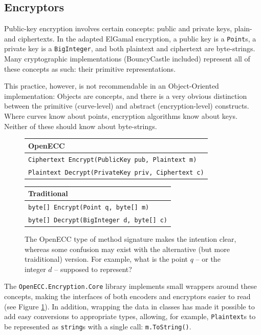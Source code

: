 \subsection{Encryptors}

Public-key encryption involves certain concepts: public and private keys, plain- and ciphertexts. In the adapted ElGamal encryption,
a public key is a \verb+Point+s, a private key is a \verb+BigInteger+, and both plaintext and ciphertext are byte-strings. Many
cryptographic implementations (BouncyCastle included) represent all of these concepts as such: their primitive representations.

This practice, however, is not recommendable in an Object-Oriented implementation: Objects are concepts, and there is a very obvious
distinction between the primitive (curve-level) and abstract (encryption-level) constructs. Where curves know about points, encryption
algorithms know about keys. Neither of these should know about byte-strings.

\begin{figure}[htb]
    \begin{tabular}{|p{\textwidth}|}
        \hline
        \textbf{OpenECC} \\
        \hline
        \texttt{Ciphertext Encrypt(PublicKey pub, Plaintext m)} \\
        \texttt{Plaintext Decrypt(PrivateKey priv, Ciphertext c)} \\
        \hline
    \end{tabular}
    
    \begin{tabular}{|p{\textwidth}|}
        \hline
        \textbf{Traditional} \\
        \hline
        \texttt{byte[] Encrypt(Point q, byte[] m)} \\
        \texttt{byte[] Decrypt(BigInteger d, byte[] c)} \\
        \hline
    \end{tabular}

    \caption{The OpenECC type of method signature makes the intention clear, whereas some confusion may exist with the alternative
        (but more traiditional) version. For example, what is the point \(q\) -- or the integer \(d\) -- supposed to represent?}
    \label{fig:encryptor_method_signatures}
\end{figure}

The \verb+OpenECC.Encryption.Core+ library implements small wrappers around these concepts, making the interfaces of both encoders and
encryptors easier to read (see Figure \ref{fig:encryptor_method_signatures}). In addition, wrapping the data in classes has made it
possible to add easy conversions to appropriate types, allowing, for example, \verb+Plaintext+s to be represented as \verb+string+s with
a single call: \verb+m.ToString()+.

